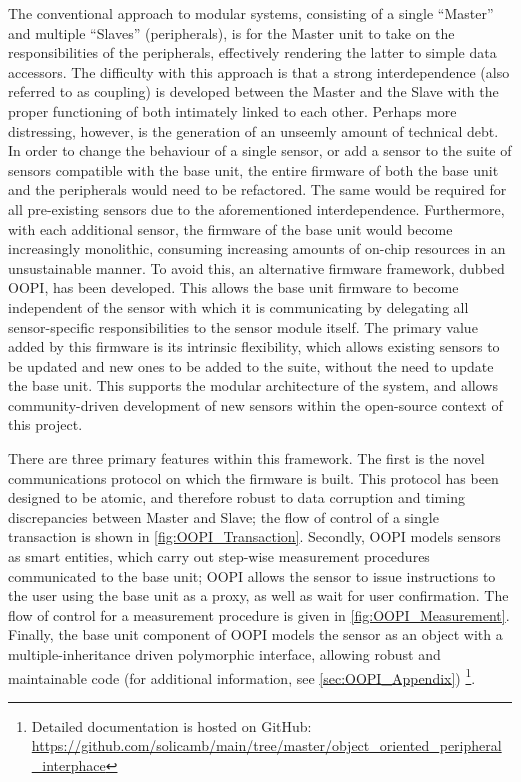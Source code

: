The conventional approach to modular systems, consisting of a single ``Master'' and multiple ``Slaves'' (peripherals), is for the Master unit to take on the responsibilities of the peripherals, effectively rendering the latter to simple data accessors. The difficulty with this approach is that a strong interdependence (also referred to as coupling) is developed between the Master and the Slave with the proper functioning of both intimately linked to each other. Perhaps more distressing, however, is the generation of an unseemly amount of technical debt. In order to change the behaviour of a single sensor, or add a sensor to the suite of sensors compatible with the base unit, the entire firmware of both the base unit and the peripherals would need to be refactored. The same would be required for all pre-existing sensors due to the aforementioned interdependence. Furthermore, with each additional sensor, the firmware of the base unit would become increasingly monolithic, consuming increasing amounts of on-chip resources in an unsustainable manner. To avoid this, an alternative firmware framework, dubbed \gls{OOPI}, has been developed. This allows the base unit firmware to become independent of the sensor with which it is communicating by delegating all sensor-specific responsibilities to the sensor module itself. The primary value added by this firmware is its intrinsic flexibility, which allows existing sensors to be updated and new ones to be added to the suite, without the need to update the base unit. This supports the modular architecture of the system, and allows community-driven development of new sensors within the open-source context of this project.

There are three primary features within this framework. The first is the novel communications protocol on which the firmware is built. This protocol has been designed to be atomic, and therefore robust to data corruption and timing discrepancies between Master and Slave; the flow of control of a single transaction is shown in \cref{fig:OOPI_Transaction}. Secondly, \gls{OOPI} models sensors as smart entities, which carry out step-wise measurement procedures communicated to the base unit; \gls{OOPI} allows the sensor to issue instructions to the user using the base unit as a proxy, as well as wait for user confirmation. The flow of control for a measurement procedure is given in \cref{fig:OOPI_Measurement}. Finally, the base unit component of OOPI models the sensor as an object with a multiple-inheritance driven polymorphic interface, allowing robust and maintainable code (for additional information, see \cref{sec:OOPI_Appendix}) \footnote{Detailed documentation is hosted on GitHub: \url{https://github.com/solicamb/main/tree/master/object_oriented_peripheral_interphace}}.
\clearpage



